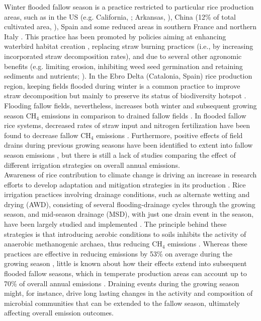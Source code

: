 Winter flooded fallow season is a practice restricted to particular rice production areas, such as in the US (e.g. California, \cite{fitzgerald2000}; Arkansas, \cite{reba2019}), China (12\% of total cultivated area, \cite{zhang2011}), Spain and some reduced areas in southern France and northern Italy \citep{pernollet2015}. This practice has been promoted by policies aiming at enhancing waterbird habitat creation \citep{elphick2010, tajiri2013effects}, replacing straw burning practices (i.e., by increasing incorporated straw decomposition rates), and due to several other agronomic benefits (e.g. limiting erosion, inhibiting weed seed germination and retaining sediments and nutrients; \cite{negri2020}). In the Ebro Delta (Catalonia, Spain) rice production region, keeping fields flooded during winter is a common practice to improve straw decomposition but mainly to preserve its status of biodiversity hotspot \citep{day2006, perez-mendez2022}. Flooding fallow fields, nevertheless, increases both winter and subsequent growing season CH$_{4}$ emissions in comparison to drained fallow fields \citep{cai2000}. In flooded fallow rice systems, decreased rates of straw input and nitrogen fertilization  have been found to decrease fallow CH$_{4}$ emissions \citep{martinez-eixarch2021a}. Furthermore, positive effects of field drains during previous growing seasons have been identified to extent into fallow season emissions \citep{martinez-eixarch2022}, but there is still a lack of studies comparing the effect of different irrigation strategies on overall annual emissions.\\


Awareness of rice contribution to climate change is driving an increase in research efforts to develop adaptation and mitigation strategies in its production \citep{alexandratos2012world, zhang2018effect, hussain2020rice}. Rice irrigation practices involving drainage conditions, such as alternate wetting and drying (AWD), consisting of several flooding-drainage cycles through the growing season, and mid-season drainage (MSD), with just one drain event in the season, have been largely studied and implemented \citep{li2004, li2014, lampayan2015}. The principle behind these strategies is that introducing aerobic conditions to soils inhibits the activity of anaerobic methanogenic archaea, thus reducing CH$_{4}$ emissions \citep{kumar2019alternate, perry2024}. Whereas these practices are effective in reducing emissions by 53\% on average during the growing season \citep{jiang2019}, little is known about how their effects extend into subsequent flooded fallow seasons, which in temperate production areas can account up to 70\% of overall annual emissions \citep{martinez2018neglecting}. Draining events during the growing season might, for instance, drive long lasting changes in the activity and composition of microbial communities that can be extended to the fallow season, ultimately affecting overall emission outcomes. \\

